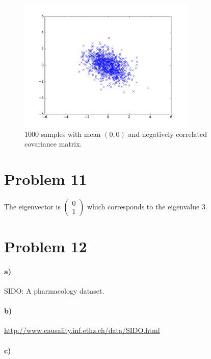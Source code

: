 \documentclass[12pt]{article}
\begin{document}
\begin{figure}[H]
        \begin{center}
                \includegraphics[height=2.5in]{Problem10-e}
                \caption{\(1000\) samples with mean \((0,0)\) and negatively correlated covariance matrix.}
        \end{center}
\end{figure}

\section*{Problem 11}

The eigenvector is \(\left(\begin{matrix}0\\1\end{matrix}\right)\) which corresponds to the eigenvalue \(3\).

\section*{Problem 12}

\paragraph{a)}

SIDO: A pharmacology dataset.

\paragraph{b)}

\href{http://www.causality.inf.ethz.ch/data/SIDO.html}{http://www.causality.inf.ethz.ch/data/SIDO.html}

\paragraph{c)}
\end{document}
